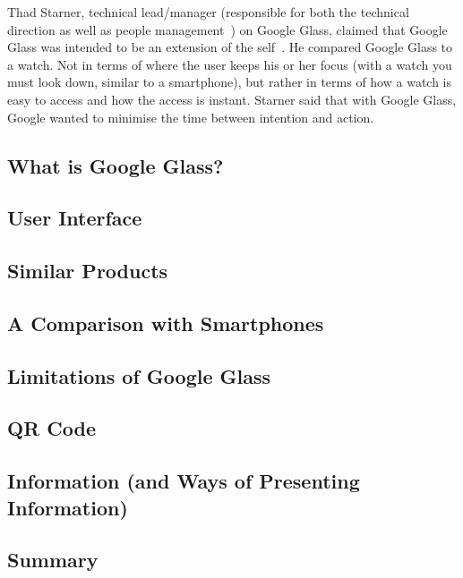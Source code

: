 Thad Starner, technical lead/manager (responsible for both the technical direction as well as people management~\cite{techLeadManager}) on Google Glass, claimed that Google Glass was intended to be an extension of the self~\cite{6504855}. He compared Google Glass to a watch. Not in terms of where the user keeps his or her focus (with a watch you must look down, similar to a smartphone), but rather in terms of how a watch is easy to access and how the access is instant. Starner said that with Google Glass, Google wanted to minimise the time between intention and action. 
%
\subsection{What is Google Glass?}
\label{subsec:googleglass}

%
\subsection{User Interface}
\label{subsec:userinterface}

%
\subsection{Similar Products}
\label{subsec:similarproducts}

%
\subsection{A Comparison with Smartphones}
\label{comparedtophones}

%
\subsection{Limitations of Google Glass}
\label{subsec:limitations}

%
\subsection{QR Code}
\label{subsec:qrcode}

%
\subsection{Information (and Ways of Presenting Information)}
\label{subsec:information}

%
\subsection{Summary}
\label{subsec:summary}

%
